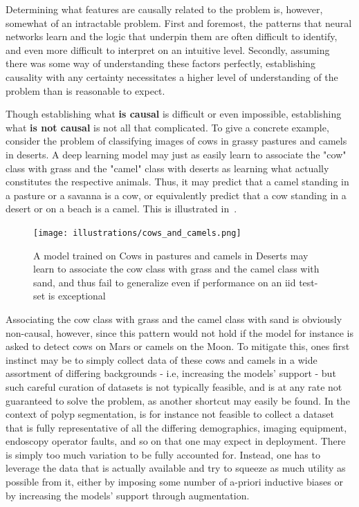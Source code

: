 Determining what features are causally related to the problem is, however, somewhat of an intractable problem. First and foremost, the patterns that neural networks learn and the logic that underpin them are often difficult to identify, and even more difficult to interpret on an intuitive level. Secondly, assuming there was some way of understanding these factors perfectly, establishing causality with any certainty necessitates a higher level of understanding of the problem than is reasonable to expect. 

Though establishing what \textbf{is causal} is difficult or even impossible, establishing what \textbf{is not causal} is not all that complicated. To give a concrete example, consider the problem of classifying images of cows in grassy pastures and camels in deserts. A deep learning model may just as easily learn to associate the "cow" class with grass and the "camel" class with deserts as learning what actually constitutes the respective animals. Thus, it may predict that a camel standing in a pasture or a savanna is a cow, or equivalently predict that a cow standing in a desert or on a beach is a camel. This is illustrated in~.

\begin{figure}[htb]
    \centering
    \texttt{[image: illustrations/cows\_and\_camels.png]}
    \caption[Cows and Camels Example]{A model trained on Cows in pastures and camels in Deserts may learn to associate the cow class with grass and the camel class with sand, and thus fail to generalize even if performance on an \gls{iid} test-set is exceptional}
    \label{fig:cows_and_camels}
\end{figure}

Associating the cow class with grass and the camel class with sand is obviously non-causal, however, since this pattern would not hold if the model for instance is asked to detect cows on Mars or camels on the Moon. To mitigate this, ones first instinct may be to simply collect data of these cows and camels in a wide assortment of differing backgrounds - i.e, increasing the models' support - but such careful curation of datasets is not typically feasible, and is at any rate not guaranteed to solve the problem, as another shortcut may easily be found. In the context of polyp segmentation, is for instance not feasible to collect a dataset that is fully representative of all the differing demographics, imaging equipment, endoscopy operator faults, and so on that one may expect in deployment.  There is simply too much variation to be fully accounted for. Instead, one has to leverage the data that is actually available and try to squeeze as much utility as possible from it, either by imposing some number of a-priori inductive biases or by increasing the models' support through augmentation.

